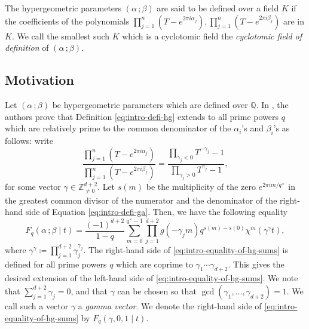 \documentclass[11pt, reqno]{amsart}
\theoremstyle{plain}
\theoremstyle{definition}
\newcommand{\Z}{\mathbb{Z}}
\newcommand{\Q}{\mathbb{Q}}
\newcommand{\ga}{\gamma}
\newcommand{\be}{\beta}
\newcommand{\al}{\alpha}
\begin{document}
The hypergeometric parameters $(\al\, ; \be)$ are said to be defined over a field $K$ if the coefficients of the polynomials
$\prod_{j=1}^n(T- e^{2\pi i \al_j}), \prod_{j=1}^n(T- e^{2\pi i \be_j})$ are in $K$. We call the smallest such $K$ which is a cyclotomic field the \emph{cyclotomic field of definition} of $(\al \,; \be)$.

\subsection{Motivation} Let $(\al \, ; \be)$ be hypergeometric parameters which are defined over $\Q$.
In \cite[Theorem 1.3]{BCM}, the authors prove that Definition \eqref{eq:intro-defi-hg} extends to all prime powers $q$ which are relatively prime to the common denominator of the $\al_i$'s and $\be_i$'s  as follows:
write 
\begin{equation}\label{eq:intro-defi-ga}
    \frac{\prod_{j=1}^n (T- e^{2\pi i \alpha_j})}{\prod_{j=1}^n (T- e^{2\pi i \beta_j}) } = \frac{ \prod_{\ga_j< 0} T^{-\ga_j} - 1}{ \prod_{\ga_j>0} T^{\ga_j} - 1} ,
\end{equation}
for some vector $\ga \in \Z^{d+2}_{\neq 0}$.
Let $s(m)$ be the multiplicity of the zero $e^{2 \pi i m/q^\times}$ in the greatest common divisor of the numerator and the denominator of the right-hand side of Equation \eqref{eq:intro-defi-ga}. 
Then,  we have the following equality
\begin{equation}\label{eq:intro-equality-of-hg-sums}
F_q\left(\al \, ; \be \mid t\right) = \frac{(-1)^{d+2}}{1-q}\sum_{m=0}^{q^\times-1} \prod_{j=1}^{d+2} g\left(-\gamma_j m \right)  q^{s(m)-s(0)} \chi^m(\gamma^{\gamma}t),
\end{equation}
where $\ga^{\ga} \coloneqq \prod_{j=1}^{d+2} \ga_j^{\ga_j}$. The right-hand side of \eqref{eq:intro-equality-of-hg-sums} is defined for all prime powers $q$ which are coprime to $\ga_1\cdots\ga_{d+2}$. This gives the desired extension of the left-hand side of \eqref{eq:intro-equality-of-hg-sums}.
We note that $\sum_{j=1}^{d+2} \ga_j=0$, and that $\gamma$ can be chosen so that $\gcd(\ga_1, \dots,\ga_{d+2})=1$. We call such a vector $\gamma$ a \emph{gamma vector}.
We denote the right-hand side of \eqref{eq:intro-equality-of-hg-sums} by $F_q(\ga,0,1 \mid t)$. 
\end{document}
